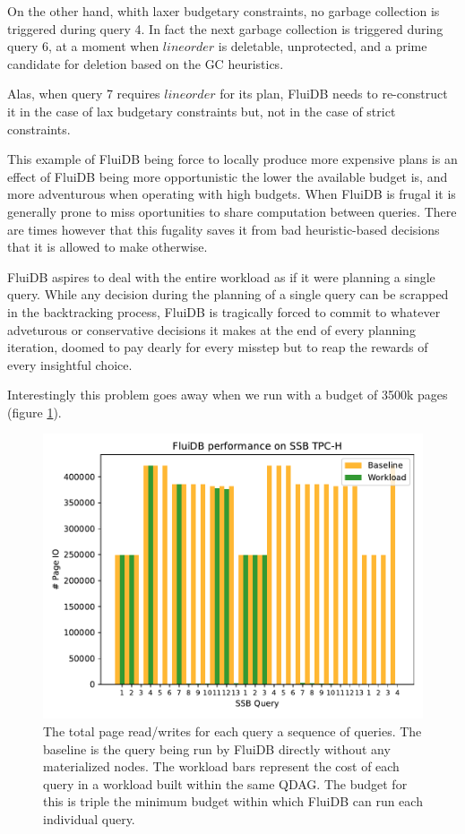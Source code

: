 On the other hand, whith laxer budgetary constraints, no garbage
collection is triggered during query 4. In fact the next garbage
collection is triggered during query 6, at a moment when
\(\mathit{lineorder}\) is deletable, unprotected, and a prime
candidate for deletion based on the GC heuristics.

Alas, when query 7 requires \(\mathit{lineorder}\) for its plan,
FluiDB needs to re-construct it in the case of lax budgetary
constraints but, not in the case of strict constraints.

This example of FluiDB being force to locally produce more expensive
plans is an effect of FluiDB being more opportunistic the lower the
available budget is, and more adventurous when operating with high
budgets. When FluiDB is frugal it is generally prone to miss
oportunities to share computation between queries. There are times
however that this fugality saves it from bad heuristic-based decisions
that it is allowed to make otherwise.

FluiDB aspires to deal with the entire workload as if it were planning
a single query. While any decision during the planning of a single
query can be scrapped in the backtracking process, FluiDB is
tragically forced to commit to whatever adveturous or conservative
decisions it makes at the end of every planning iteration, doomed to
pay dearly for every misstep but to reap the rewards of every
insightful choice.

Interestingly this problem goes away when we run with a budget of
3500k pages (figure \ref{fig:extra_large_budget_plot}).

\begin{figure}[p]
\centering
\includegraphics[width=.9\linewidth]{./plans/io_perf_65000.pdf}

\caption{\label{fig:extra_large_budget_plot}
  The total page read/writes for each query a sequence of queries. The
  baseline is the query being run by FluiDB directly without any
  materialized nodes. The workload bars represent the cost of each
  query in a workload built within the same QDAG. The budget for this
  is triple the minimum budget within which FluiDB can run each
  individual query.}
\end{figure}



